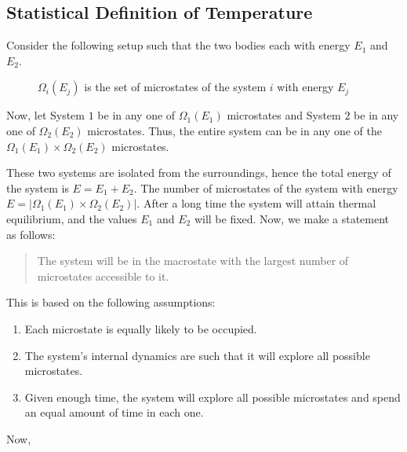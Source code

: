 \documentclass[12pt, oneside]{book}
\begin{document}
\subsection{Statistical Definition of Temperature}
Consider the following setup such that the two bodies each with energy \(E_1\) and \(E_2\).
\begin{figure}[H]
    \centering
    \caption{\(\Omega_i(E_j)\) is the set of microstates of the system \(i\) with energy \(E_j\)}
\end{figure}
Now, let System \(1\) be in any one of \( \Omega_1(E_1)\) microstates and System \(2\) be in any one of \( \Omega_2(E_2)\) microstates.
Thus, the entire system can be in any one of the \( \Omega_1(E_1) \times \Omega_2(E_2)\) microstates.

These two systems are isolated from the surroundings, hence the total energy of the system is \(E = E_1 + E_2\).
The number of microstates of the system with energy \(E = \left| \Omega_1(E_1) \times \Omega_2(E_2) \right| \).
After a long time the system will attain thermal equilibrium, and the values \(E_1\) and \(E_2\) will be fixed.
Now, we make a statement as follows:
\begin{quote}
    The system will be in the macrostate with the largest number of microstates accessible to it.
\end{quote}
This is based on the following assumptions:
\begin{enumerate}
    \item Each microstate is equally likely to be occupied.
    \item The system's internal dynamics are such that it will explore all possible microstates.
    \item Given enough time, the system will explore all possible microstates and spend an equal amount of time in each one.
\end{enumerate}
Now, 
\end{document}
